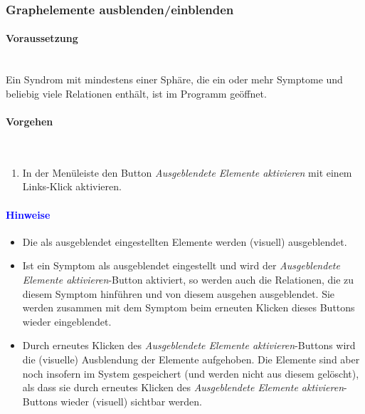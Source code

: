 \documentclass[enabledeprecatedfontcommands,fontsize=11pt,paper=a4,twoside]{scrartcl}
\newcounter{one}
\newcommand*{\hint}{\paragraph{\textcolor{blue}{Hinweise}}}
\newcommand*{\condition}{\paragraph{Voraussetzung}$\;$ \vspace{0.2cm}\\}
\newcommand*{\actions}{\paragraph{Vorgehen} $\;$\vspace{0.2cm}\\}
\begin{document}
	\newpage
		\subsubsection{Graphelemente ausblenden/einblenden}
				\condition 	
		Ein Syndrom mit mindestens einer Sphäre, die ein oder mehr Symptome und beliebig viele Relationen enthält, ist im Programm geöffnet.
		\actions
			\begin{enumerate}
				\item In der Menüleiste den Button \textit{Ausgeblendete Elemente aktivieren} mit einem Links-Klick aktivieren.
			\end{enumerate}
		\hint
		\begin{itemize}
					\item Die als ausgeblendet eingestellten Elemente werden (visuell) ausgeblendet. 
					\item Ist ein Symptom als ausgeblendet eingestellt und wird der \textit{Ausgeblendete Elemente aktivieren}-Button aktiviert, so werden auch die Relationen, die zu diesem Symptom hinführen und von diesem ausgehen ausgeblendet. Sie werden zusammen mit dem Symptom beim erneuten Klicken dieses Buttons wieder eingeblendet.
					\item Durch erneutes Klicken des \textit{Ausgeblendete Elemente aktivieren}-Buttons wird die (visuelle) Ausblendung der Elemente aufgehoben. Die Elemente sind aber noch insofern im System gespeichert (und werden nicht aus diesem gelöscht), als dass sie durch erneutes Klicken des \textit{Ausgeblendete Elemente aktivieren}-Buttons wieder (visuell) sichtbar werden.
		\end{itemize}
		
			\newpage
\end{document}
